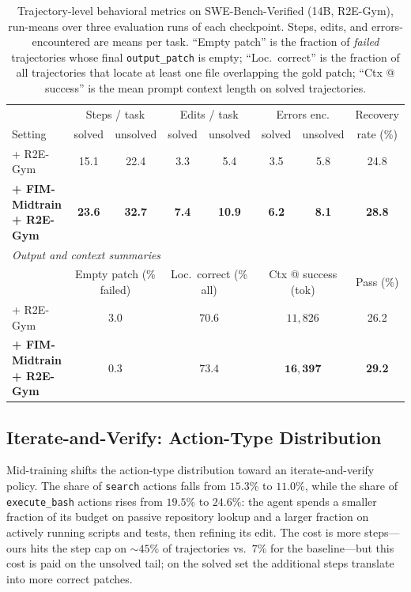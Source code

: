 \begin{table}[h]
\centering
\caption{Trajectory-level behavioral metrics on SWE-Bench-Verified
(14B, R2E-Gym), run-means over three evaluation runs of each
checkpoint. Steps, edits, and errors-encountered are means per task.
``Empty patch'' is the fraction of \emph{failed} trajectories whose
final \texttt{output\_patch} is empty; ``Loc.\ correct'' is the
fraction of all trajectories that locate at least one file overlapping
the gold patch; ``Ctx @ success'' is the mean prompt context length on
solved trajectories.}
\label{tab:behavior_full}
\small
\setlength{\tabcolsep}{4pt}
\begin{tabular}{l c c c c c c c}
\toprule
& \multicolumn{2}{c}{Steps / task}
& \multicolumn{2}{c}{Edits / task}
& \multicolumn{2}{c}{Errors enc.}
& Recovery \\
\cmidrule(lr){2-3}\cmidrule(lr){4-5}\cmidrule(lr){6-7}
Setting & solved & unsolved & solved & unsolved & solved & unsolved & rate (\%) \\
\midrule
+ R2E-Gym
  & 15.1 & 22.4 & 3.3 & 5.4 & 3.5 & 5.8 & 24.8 \\
\textbf{+ FIM-Midtrain + R2E-Gym}
  & \textbf{23.6} & \textbf{32.7} & \textbf{7.4} & \textbf{10.9}
  & \textbf{6.2} & \textbf{8.1} & \textbf{28.8} \\
\midrule
\multicolumn{8}{l}{\textit{Output and context summaries}} \\
\midrule
& \multicolumn{2}{c}{Empty patch (\% failed)}
& \multicolumn{2}{c}{Loc.\ correct (\% all)}
& \multicolumn{2}{c}{Ctx @ success (tok)}
& Pass (\%) \\
\cmidrule(lr){2-3}\cmidrule(lr){4-5}\cmidrule(lr){6-7}
+ R2E-Gym
  & \multicolumn{2}{c}{$3.0$} & \multicolumn{2}{c}{$70.6$}
  & \multicolumn{2}{c}{$11{,}826$} & 26.2 \\
\textbf{+ FIM-Midtrain + R2E-Gym}
  & \multicolumn{2}{c}{$\mathbf{0.3}$} & \multicolumn{2}{c}{$\mathbf{73.4}$}
  & \multicolumn{2}{c}{$\mathbf{16{,}397}$} & \textbf{29.2} \\
\bottomrule
\end{tabular}
\end{table}

\subsection{Iterate-and-Verify: Action-Type Distribution}
\label{app:behavior_extra:actions}

Mid-training shifts the action-type distribution toward an
iterate-and-verify policy. The share of \texttt{search} actions falls
from $15.3\%$ to $11.0\%$, while the share of \texttt{execute\_bash}
actions rises from $19.5\%$ to $24.6\%$: the agent spends a smaller
fraction of its budget on passive repository lookup and a larger
fraction on actively running scripts and tests, then refining its
edit. The cost is more steps---ours hits the step cap on $\sim\!45\%$
of trajectories vs.\ $7\%$ for the baseline---but this cost is paid on
the unsolved tail; on the solved set the additional steps translate
into more correct patches.


